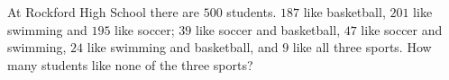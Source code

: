 At Rockford High School there are $500$ students. $187$ like basketball, $201$ like swimming and $195$ like soccer; $39$ like soccer and basketball, $47$ like soccer and swimming, $24$ like swimming and basketball, and $9$ like all three sports. How many students like none of the three sports?
